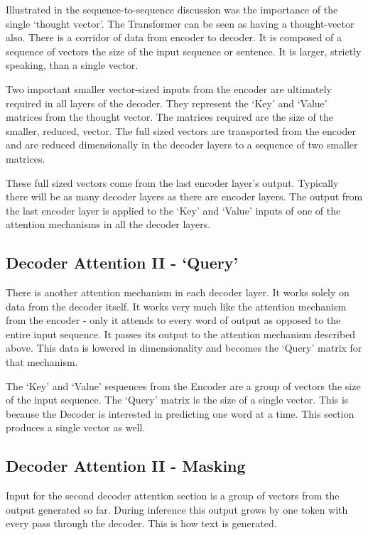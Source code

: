 Illustrated in the sequence-to-sequence discussion was the importance of the single `thought vector'. The Transformer can be seen as having a thought-vector also. There is a corridor of data from encoder to decoder. It is composed of a sequence of vectors the size of the input sequence or sentence. It is larger, strictly speaking, than a single vector.

Two important smaller vector-sized inputs from the encoder are ultimately required in all layers of the decoder. They represent the `Key' and `Value' matrices from the thought vector. The matrices required are the size of the smaller, reduced, vector. The full sized vectors are transported from the encoder and are reduced dimensionally in the decoder layers to a sequence of two smaller matrices. 

These full sized vectors come from the last encoder layer's output. Typically there will be as many decoder layers as there are encoder layers. The output from the last encoder layer is applied to the `Key' and `Value' inputs of one of the attention mechanisms in all the decoder layers.

\subsection{Decoder Attention II - `Query'}
There is another attention mechanism in each decoder layer. It works solely on data from the decoder itself. It works very much like the attention mechanism from the encoder - only it attends to every word of output as opposed to the entire input sequence. It passes its output to the attention mechanism described above. This data is lowered in dimensionality and becomes the `Query' matrix for that mechanism. 

The `Key' and `Value' sequences from the Encoder are a group of vectors the size of the input sequence. The `Query' matrix is the size of a single vector. This is because the Decoder is interested in predicting one word at a time. This section produces a single vector as well.

\subsection{Decoder Attention II - Masking}
Input for the second decoder attention section is a group of vectors from the output generated so far. During inference this output grows by one token with every pass through the decoder. This is how text is generated.

